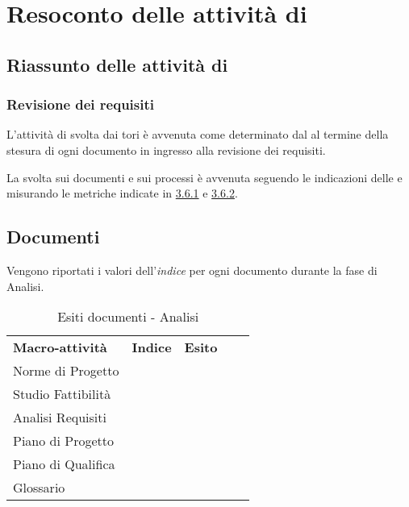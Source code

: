\newpage
\section{Resoconto delle attività di } \label{App:AppendixA}
	\subsection{Riassunto delle attività di } \label{App:AppendixA}
		\subsubsection{Revisione dei requisiti} \label{App:AppendixA}
			
			L'attività di  svolta dai tori è avvenuta come determinato dal \PianoDiProgetto al termine della stesura di ogni documento in ingresso alla revisione dei requisiti.
			
			La  svolta sui documenti e sui processi è avvenuta seguendo le indicazioni delle \NormeDiProgetto e misurando le metriche indicate in \hyperlink{metriche_documenti}{3.6.1} e \hyperlink{metriche_processi}{3.6.2}.
\subsection{Documenti} \label{App:AppendixB}
	
		Vengono riportati i valori dell’\textit{indice } per ogni documento durante la fase di Analisi. 
		
		\begin{table}[!ht]
			\centering
				\begin{tabular}{|l|l|l|ll}
					\cline{1-3}
					 \textbf{Macro-attività}  & \textbf{Indice \glossaryItem{Gulpease}}  & \textbf{Esito}  &  \\ \cline{1-3}
					 Norme di Progetto  &  &  &  \\ \cline{1-3}
					 Studio Fattibilità &  &  &  \\ \cline{1-3}
					 Analisi Requisiti &  &  &  \\ \cline{1-3}
					 Piano di Progetto &  &  &  \\ \cline{1-3}
					 Piano di Qualifica &  &  &  \\ \cline{1-3}
					 Glossario &  &  &  \\ \cline{1-3}
				\end{tabular}
				\caption{Esiti  documenti - Analisi}
		\end{table}

